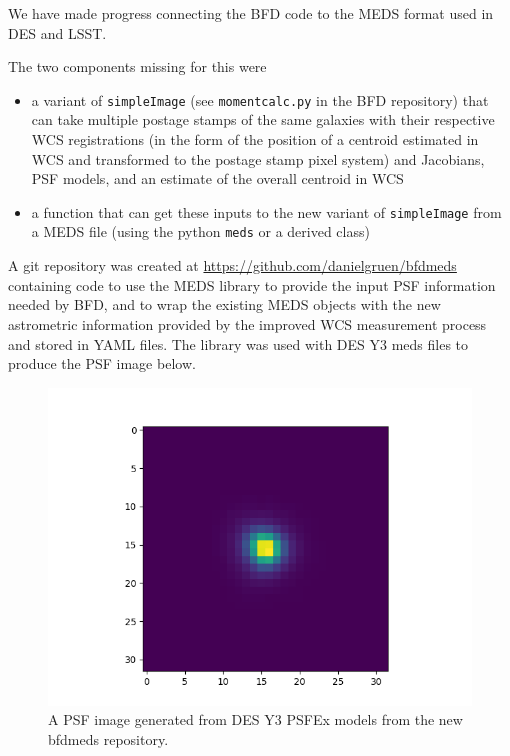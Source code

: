 \documentclass[\docopts]{\docclass}
\begin{document}
We have made progress connecting the BFD code to the MEDS format used in DES and LSST.

The two components missing for this were
\begin{itemize}
\item a variant of \texttt{simpleImage} (see \texttt{momentcalc.py} in the BFD repository) that can take multiple postage stamps of the same galaxies with their respective WCS registrations (in the form of the position of a centroid estimated in WCS and transformed to the postage stamp pixel system) and Jacobians, PSF models, and an estimate of the overall centroid in WCS 
\item a function that can get these inputs to the new variant of \texttt{simpleImage} from a MEDS file (using the python \texttt{meds} or a derived class) 
\end{itemize}

A git repository was created at \url{https://github.com/danielgruen/bfdmeds} containing code to use the MEDS library to provide the input PSF information needed by BFD, and to wrap the existing MEDS objects with the new astrometric information provided by the improved WCS measurement process and stored in YAML files.  The library was used with DES Y3 meds files to produce the PSF image below.


\begin{figure}[h]
\includegraphics[width=0.9\columnwidth]{figures/psf-example.png}
\caption{A PSF image generated from DES Y3 PSFEx models from the new bfdmeds repository.}
\end{figure}




\end{document}
